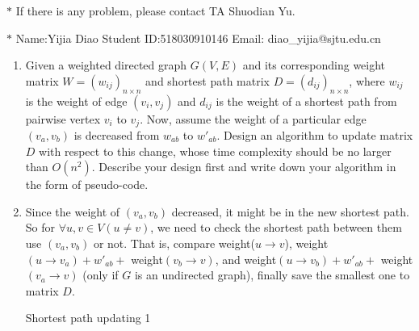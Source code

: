 \documentclass[12pt,a4paper,UTF8]{article}
\makeatletter
\newtheorem*{solution}{Solution}
\theoremstyle{definition}
\renewenvironment{solution}[1][Solution] {\par\pushQED{\qed}\normalfont\topsep6\p@\@plus6\p@\relax\trivlist\item[\hskip\labelsep\bfseries#1\@addpunct{.}]\ignorespaces}{\popQED\endtrivlist\@endpefalse} \makeatother
\makeatother
\begin{document}
\noindent

\noindent{}
\begin{center}
\footnotesize{\color{red}$*$ If there is any problem, please contact TA Shuodian Yu. }

\footnotesize{\color{blue}$*$ Name:Yijia Diao  \quad Student ID:518030910146 \quad Email: diao\_yijia@sjtu.edu.cn}
\end{center}
\begin{enumerate}
\item Given a weighted directed graph $G(V, E)$ and its corresponding weight matrix $W=(w_{ij})_{n \times n}$ and shortest path matrix $D=(d_{ij})_{n \times n}$, where $w_{ij}$ is the weight of edge $(v_i, v_j)$ and $d_{ij}$ is the weight of a shortest path from pairwise vertex $v_i$ to $v_j$. Now, assume the weight of a particular edge $(v_a, v_b)$ is decreased from $w_{ab}$ to $w'_{ab}$. Design an algorithm to update matrix $D$ with respect to this change, whose time complexity should be no larger than $O(n^2)$. Describe your design first and write down your algorithm in the form of pseudo-code.
    \begin{solution}
    	Since the weight of $(v_a, v_b)$ decreased, it might be in the new shortest path. So for $ \forall u,v\in V (u\ne v)$, we need to check the shortest path between them use $(v_a, v_b)$ or not. That is, compare weight($u\rightarrow v $), weight$( u\rightarrow v_a ) + w'_{ab} + $ weight$ ( v_b\rightarrow v ) $, and weight$( u\rightarrow v_b ) + w'_{ab} + $ weight$ ( v_a\rightarrow v ) $ (only if $ G $ is an undirected graph), finally save the smallest one to matrix $ D $.\\
        \begin{minipage}[t]{0.89\textwidth}
        	\begin{algorithm}[H]
        		\BlankLine
        		\caption{Shortest path updating 1}
        		\label{Alg-1}
        		
        		

\end{algorithm}
\end{minipage}
\end{solution}
\end{enumerate}
\end{document}
